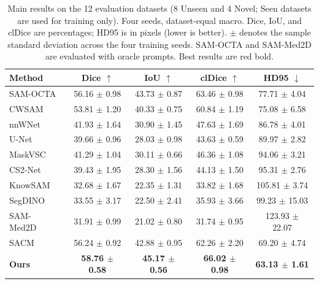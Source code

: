 \begin{table}[!t]
\centering
\caption{Main results on the 12 evaluation datasets (8 Unseen and 4 Novel;
Seen datasets are used for training only).  Four seeds, dataset-equal macro.
Dice, IoU, and clDice are percentages; HD95 is in pixels (lower is better).
$\pm$ denotes the sample standard deviation across the four training seeds.
SAM-OCTA and SAM-Med2D are evaluated with oracle prompts.  Best results are red bold.}
\label{tab:dcd_main}
\scriptsize
\setlength{\tabcolsep}{4.5pt}
\begin{tabular*}{\textwidth}{@{\extracolsep{\fill}}lcccc@{}}
\toprule
Method & Dice $\uparrow$ & IoU $\uparrow$ & clDice $\uparrow$ & HD95 $\downarrow$ \\
\midrule
SAM-OCTA~\cite{wang2024sam_octa} & 56.16 $\pm$ 0.98 & 43.73 $\pm$ 0.87 & 63.46 $\pm$ 0.98 & 77.71 $\pm$ 4.04 \\
CWSAM~\cite{pu2025cwsam} & 53.81 $\pm$ 1.20 & 40.33 $\pm$ 0.75 & 60.84 $\pm$ 1.19 & 75.08 $\pm$ 6.58 \\
nnWNet~\cite{zhou2025nnwnet} & 41.93 $\pm$ 1.64 & 30.90 $\pm$ 1.45 & 47.63 $\pm$ 1.69 & 86.78 $\pm$ 4.01 \\
U-Net~\cite{ronneberger2015unet} & 39.66 $\pm$ 0.96 & 28.03 $\pm$ 0.98 & 43.63 $\pm$ 0.59 & 89.97 $\pm$ 2.82 \\
MaskVSC~\cite{zhou2025maskvsc} & 41.29 $\pm$ 1.04 & 30.11 $\pm$ 0.66 & 46.36 $\pm$ 1.08 & 94.06 $\pm$ 3.21 \\
CS2-Net~\cite{mou2021cs2net} & 39.43 $\pm$ 1.95 & 28.30 $\pm$ 1.56 & 44.13 $\pm$ 1.50 & 95.31 $\pm$ 2.76 \\
KnowSAM~\cite{huang2025knowsam} & 32.68 $\pm$ 1.67 & 22.35 $\pm$ 1.31 & 33.82 $\pm$ 1.68 & 105.81 $\pm$ 3.74 \\
SegDINO~\cite{yang2025segdino} & 33.55 $\pm$ 3.17 & 22.50 $\pm$ 2.41 & 35.93 $\pm$ 3.66 & 99.23 $\pm$ 15.03 \\
SAM-Med2D~\cite{cheng2023sammed2d} & 31.91 $\pm$ 0.99 & 21.02 $\pm$ 0.80 & 31.74 $\pm$ 0.95 & 123.93 $\pm$ 22.07 \\
SACM~\cite{zhu2026sacm} & 56.24 $\pm$ 0.92 & 42.88 $\pm$ 0.95 & 62.26 $\pm$ 2.20 & 69.20 $\pm$ 4.74 \\
\midrule
\textbf{Ours} & \textcolor{red!80!black}{\textbf{58.76 $\pm$ 0.58}} & \textcolor{red!80!black}{\textbf{45.17 $\pm$ 0.56}} & \textcolor{red!80!black}{\textbf{66.02 $\pm$ 0.98}} & \textcolor{red!80!black}{\textbf{63.13 $\pm$ 1.61}} \\
\bottomrule
\end{tabular*}
\end{table}


